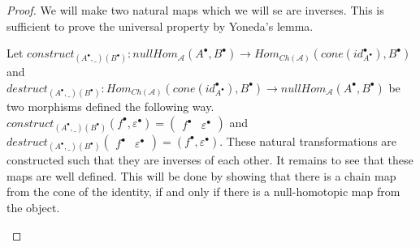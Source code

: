 \documentclass[11pt]{article}
\theoremstyle{definition}
\theoremstyle{remark}
\newcommand{\chain}[1]{#1^{\bullet}}
\begin{document}
            \begin{proof}
                We will make two natural maps which we will se are inverses. This is sufficient to prove the universal property by Yoneda's lemma.

                Let $construct_{(\chain{A},\_)(\chain{B})}:nullHom_{\mathcal{A}}(\chain{A},\chain{B})\rightarrow Hom_{Ch(\mathcal{A})}(cone(\chain{id_{\chain{A}}}),\chain{B})$ and \\$destruct_{(\chain{A},\_)(\chain{B})}:Hom_{Ch(\mathcal{A})}(cone(\chain{id_{\chain{A}}}),\chain{B})\rightarrow nullHom_{\mathcal{A}}(\chain{A},\chain{B})$ be two morphisms defined the following way.
                $construct_{(\chain{A},\_)(\chain{B})}(\chain{f},\chain{\varepsilon})=\begin{pmatrix}\chain{f} & \chain{\varepsilon}\end{pmatrix}$ and \\$destruct_{(\chain{A},\_)(\chain{B})}\begin{pmatrix}\chain{f} & \chain{\varepsilon}\end{pmatrix} = (\chain{f}, \chain{\varepsilon})$. These natural transformations are constructed such that they are inverses of each other. It remains to see that these maps are well defined. This will be done by showing that there is a chain map from the cone of the identity, if and only if there is a null-homotopic map from the object.

                \begin{center}
                \end{center}


\end{proof}
\end{document}
